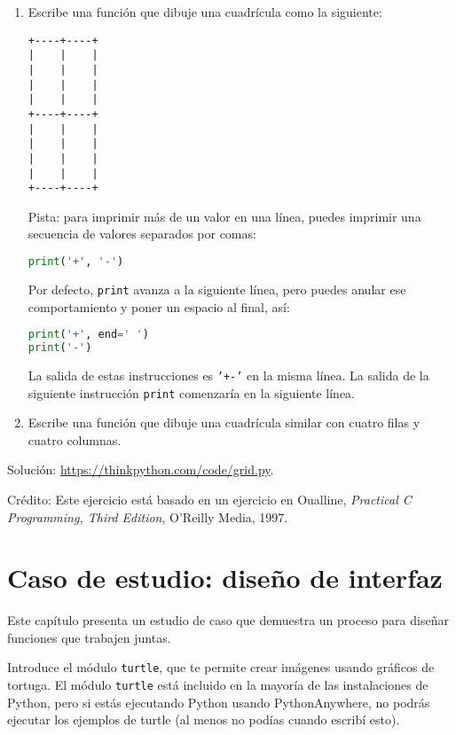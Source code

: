 \documentclass[12pt,letterpaper]{book}
\begin{document}
\begin{enumerate}
\item Escribe una función que dibuje una cuadrícula como la siguiente:

\begin{lstlisting}
+----+----+
|    |    |
|    |    |
|    |    |
|    |    |
+----+----+
|    |    |
|    |    |
|    |    |
|    |    |
+----+----+
\end{lstlisting}

Pista: para imprimir más de un valor en una línea, puedes imprimir una secuencia de valores separados por comas:

\begin{lstlisting}[language=Python]
print('+', '-')
\end{lstlisting}

Por defecto, \texttt{print} avanza a la siguiente línea, pero puedes anular ese comportamiento y poner un espacio al final, así:

\begin{lstlisting}[language=Python]
print('+', end=' ')
print('-')
\end{lstlisting}

La salida de estas instrucciones es \texttt{'+-'} en la misma línea. La salida de la siguiente instrucción \texttt{print} comenzaría en la siguiente línea.

\item Escribe una función que dibuje una cuadrícula similar con cuatro filas y cuatro columnas.
\end{enumerate}

Solución: \href{https://thinkpython.com/code/grid.py}{https://thinkpython.com/code/grid.py}.

Crédito: Este ejercicio está basado en un ejercicio en Oualline, \textit{Practical C Programming, Third Edition}, O'Reilly Media, 1997.


\chapter{Caso de estudio: diseño de interfaz}

Este capítulo presenta un estudio de caso que demuestra un proceso para diseñar funciones que trabajen juntas.

Introduce el módulo \texttt{turtle}, que te permite crear imágenes usando gráficos de tortuga. El módulo \texttt{turtle} está incluido en la mayoría de las instalaciones de Python, pero si estás ejecutando Python usando PythonAnywhere, no podrás ejecutar los ejemplos de turtle (al menos no podías cuando escribí esto).
\end{document}
